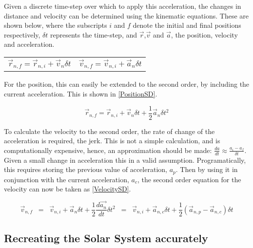 \documentclass[a4paper,10pt]{article}
\begin{document}
Given a discrete time-step over which to apply this acceleration, the changes in distance and velocity can be determined using the kinematic equations. These are shown below, where the subscripts $i$ and $f$ denote the initial and final positions respectively, $\delta t$ represents the time-step, and $\vec r$,$\vec v$ and $\vec a$, the position, velocity and acceleration. %

\noindent\begin{tabularx}{\textwidth}{@{}XX@{}}
  \begin{equation*}
   \vec{r}_{n,f} =  \vec{r}_{n,i} + \vec{v}_{n} \delta t
    \label{PositionFD}
  \end{equation*} &
  \begin{equation*}
 \vec{v}_{n,f} =  \vec{v}_{n,i} + \vec{a}_{n} \delta t
    \label{VelocityFD}
  \end{equation*}
\end{tabularx}

For the position, this can easily be extended to the second order, by including the current acceleration. This is shown in \cref{PositionSD}.

\begin{equation} \label{PositionSD}
    \vec{r}_{n,f} =  \vec{r}_{n,i} + \vec{v}_{n} \delta t + \frac{1}{2}\vec{a}_{n}\delta t^2
\end{equation}

To calculate the velocity to the second order, the rate of change of the acceleration is required, the jerk. This is not a simple calculation, and is computationally expensive, hence, an approximation should be made: $\frac{da}{dt} \approx \frac{a_i - a_f}{\delta t}$. Given a small change in acceleration this in a valid assumption. Programatically, this requires storing the previous value of acceleration, $a_p$. Then by using it in conjunction with the current acceleration, $a_c$, the second order equation for the velocity can now be taken as \cref{VelocitySD}.

\begin{equation} \label{VelocitySD}
     \vec{v}_{n,f} \;\; =  \;\; \vec{v}_{n,i} + \vec{a}_{n} \delta t + \frac{1}{2}\frac{d\vec{a_n}}{dt}\delta t^2 \;\; = \;\; \vec{v}_{n,i} + \vec{a}_{n,c} \delta t + \frac{1}{2}(\vec{a}_{n,p} - \vec{a}_{n,c})\delta t
\end{equation}

\subsection{Recreating the Solar System accurately}
\end{document}
